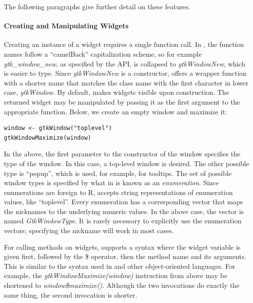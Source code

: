 \documentclass[article]{jss}
\begin{document}
The following paragraphs give further detail on these features.

\paragraph{Creating and Manipulating Widgets}

Creating an instance of a  widget requires a single  
function call. In , the function names follow a ``camelBack'' 
capitalization scheme, so for example \emph{gtk\_window\_new}, as specified
by the   API, is collapsed to 
\emph{gtkWindowNew}, which is easier to type. Since \emph{gtkWindowNew} is a constructor,
 offers a wrapper function with a shorter name that matches the
class name with the first character in lower case, \emph{gtkWindow}. By default, 
 makes widgets visible upon construction.
The returned widget may be manipulated by passing it as the 
first argument to the appropriate  function. Below, we create an 
empty window and maximize it:

\begin{verbatim}
window <- gtkWindow("toplevel")
gtkWindowMaximize(window)
\end{verbatim}

In the above, the first parameter to the constructor of the window specifies
the type of the window. In this case, a top-level window is desired. The other
possible type is ``popup'', which is used, for example, for tooltips. The
set of possible window types is specified by what in  is known as
an \emph{enumeration}. Since enumerations are foreign to R,  accepts
string representations of enumeration values, like ``toplevel''. Every
enumeration has a corresponding  vector that maps the nicknames to 
the underlying numeric values. In the above case, the vector is named 
\emph{GtkWindowType}. It is rarely necessary to explicitly use the enumeration 
vectors; specifying the nickname will work in most cases.

For calling methods on widgets,  supports a syntax where the widget
variable is given first, followed by the \$ operator, then the method
name and its arguments. This is similar to the syntax used in  and other 
object-oriented languages. For example, the \emph{gtkWindowMaximize(window)}
instruction from above may be shortened to \emph{window\$maximize()}. 
Although the two invocations do exactly the same thing, the second invocation is shorter.
\end{document}
